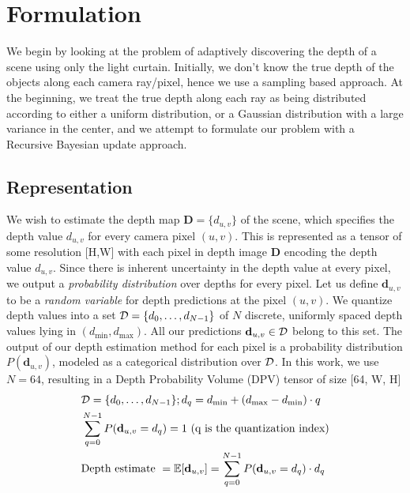 
\section{Formulation}

\newcommand{\DD}{\mathbf{D}}
\newcommand{\dd}{\mathbf{d}}

We begin by looking at the problem of adaptively discovering the depth of a scene using only the light curtain. Initially, we don't know the true depth of the objects along each  camera ray/pixel, hence we use a sampling based approach. At the beginning, we treat the true depth along each ray as being distributed according to either a uniform distribution, or a Gaussian distribution with a large variance in the center, and we attempt to formulate our problem with a Recursive Bayesian update approach.

\subsection{Representation}

\smallskip
We wish to estimate the depth map $\DD = \{d_{u, v}\}$ of the scene, which specifies the depth value $d_{u, v}$ for every camera pixel $(u, v)$. This is represented as a tensor of some resolution [H,W] with each pixel in depth image $\DD$ encoding the depth value $d_{u,v}$. Since there is inherent uncertainty in the depth value at every pixel, we output a \textit{probability distribution} over depths for every pixel. Let us define $\dd_{u,v}$ to be a \textit{random variable} for depth predictions at the pixel $(u, v)$. We quantize depth values into a set $\mathcal{D} = \{d_0, \dots, d_{N-1}\}$ of $N$ discrete, uniformly spaced depth values lying in $(d_\text{min}, d_\text{max})$. All our predictions $\dd_{u, v} \in \D$ belong to this set. The output of our depth estimation method for each pixel is a probability distribution $P(\dd_{u, v})$, modeled as a categorical distribution over $\mathcal{D}$. In this work, we use $N=64$, resulting in a Depth Probability Volume (DPV) tensor of size [64, W, H]
\begin{align}
   &\D=\{d_0, \dots, d_{N-1}\}; d_{q}=d_\text{min}+(d_\text{max}-d_\text{min}) \cdot q
   \label{eq:d_candi}
   \\
   &\sum_{q=0}^{N-1} P(\dd_{u,v} = d_q) =1 \ \text{(q is the quantization index)}
   \label{eq:depth_dist}\\
   &\text{Depth estimate } = \mathbb{E} [ \dd_{u,v}] = \sum_{q=0}^{N-1} P(\dd_{u,v}=d_q)\cdot d_q
\end{align}


